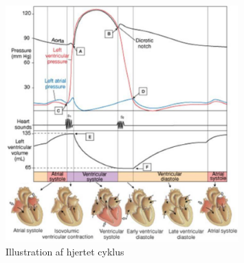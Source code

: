 \begin{figure}[H]
	\centering
	\includegraphics[width=0.8\textwidth]{Figurer/Snip20151209_68}
	\caption{Illustration af hjertet cyklus}
\end{figure}

